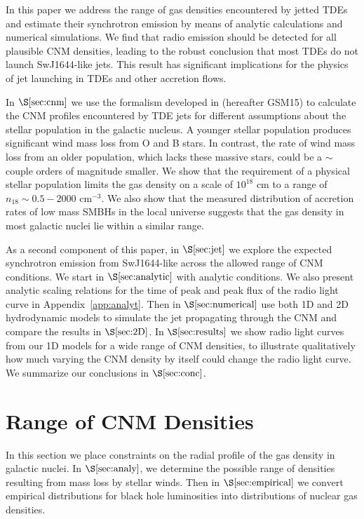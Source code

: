\documentclass[usenatbib,fleqn]{mnras}
\begin{document}
In this paper we address the range of gas densities encountered by
jetted TDEs and estimate their synchrotron emission by means of
analytic calculations and numerical simulations.  We find that radio
emission should be detected for all plausible CNM densities, leading to the robust conclusion that most TDEs do not launch SwJ1644-like
jets.  This result has significant implications for the physics
of jet launching in TDEs and other accretion flows. 

In $\S\ref{sec:cnm}$ we use the formalism developed in
\citet{Generozov+2015} (hereafter GSM15) to calculate the CNM profiles
encountered by TDE jets for different assumptions about the stellar
population in the galactic nucleus.  A younger stellar population
produces significant wind mass loss from O and B stars. In contrast,
the rate of wind mass loss from an older population, which lacks these
massive stars, could be a $\sim$couple orders of magnitude smaller.
We show that the requirement of a physical stellar population limits
the gas density on a scale of $10^{18}$ cm to a range of $n_{18} \sim
0.5-2000$ cm$^{-3}$. We also show that the measured distribution of
accretion rates of low mass SMBHs in the local universe suggests that
the gas density in most galactic nuclei lie within a similar range.

As a second component of this paper, in $\S\ref{sec:jet}$ we explore
the expected synchrotron emission from SwJ1644-like
across the allowed range of CNM conditions.  We start in
$\S\ref{sec:analytic}$ with analytic conditions. We also present
analytic scaling relations for the time of peak and peak flux of the
radio light curve in Appendix~\ref{app:analyt}.  Then in
$\S\ref{sec:numerical}$ use both 1D and 2D hydrodynamic models to
simulate the jet propagating through the CNM and compare the results
in $\S\ref{sec:2D}$. In $\S\ref{sec:results}$ we show radio light
curves from our 1D models for a wide range of CNM densities, to
illustrate qualitatively how much varying the CNM density by itself
could change the radio light curve.  We summarize our conclusions in
$\S\ref{sec:conc}$.

\section{Range of CNM Densities}
\label{sec:cnm}

In this section we place constraints on the radial profile of the gas
density in galactic nuclei. In $\S\ref{sec:analy}$, we determine the possible range of
densities resulting from mass loss by stellar winds. Then in $\S\ref{sec:empirical}$ we convert
empirical distributions for black hole luminosities into distributions
of nuclear gas densities.
\end{document}
